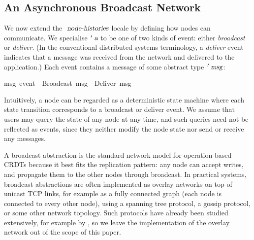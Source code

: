 \subsection{An Asynchronous Broadcast Network}\label{sect.network.broadcast}

We now extend the $\isa{node-histories}$ locale by defining how nodes can communicate.
We specialise $\isacharprime\isa{a}$ to be one of two kinds of event: either \emph{broadcast} or \emph{deliver}.
(In the conventional distributed systems terminology, a \emph{deliver} event indicates that a message was received from the network and delivered to the application.)
Each event contains a message of some abstract type $\isacharprime\isa{msg}$:
\begin{isabelle}
 {\isacharprime}msg\ event\ {\isacharequal}\ Broadcast\ {\isacharprime}msg\ {\isacharbar}\ Deliver\ {\isacharprime}msg
\end{isabelle}

Intuitively, a node can be regarded as a deterministic state machine where each state transition corresponds to a broadcast or deliver event.
We assume that users may query the state of any node at any time, and such queries need not be reflected as events, since they neither modify the node state nor send or receive any messages.

A broadcast abstraction is the standard network model for operation-based CRDTs because it best fits the replication pattern: any node can accept writes, and propagate them to the other nodes through broadcast.
In practical systems, broadcast abstractions are often implemented as overlay networks on top of unicast TCP links, for example as a fully connected graph (each node is connected to every other node), using a spanning tree protocol, a gossip protocol, or some other network topology.
Such protocols have already been studied extensively, for example by \citet{Leitao:2007gq}, so we leave the implementation of the overlay network out of the scope of this paper.

